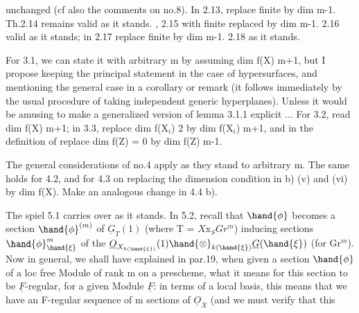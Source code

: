 
unchanged (cf also  the comments on no.8). In 2.13, replace finite
by dim \hand{$\leqslant$} m-1. Th.2.14 remains valid as it stands. , 2.15 with
finite replaced by dim \hand{$\leqslant$} m-1. 2.16 valid as it stands; in
 2.17 replace finite by dim \hand{$\leqslant$} m-1. 2.18 as it stands.

For 3.1, we can state it with arbitrary m by assuming
dim f(X) \hand{$\geqslant$} m+1, but I propose keeping the principal statement in
the case of hypersurfaces, and mentioning the general case in a corollary
or remark (it follows immediately by the usual procedure of
taking independent generic hyperplanes). Unless it would be
amusing to make a generalized version of lemma 3.1.1 explicit ...
For 3.2, read dim f(X)\hand{$\geqslant$} m+1; in 3.3, replace dim f(X$_i$) \hand{$\geqslant$} 2
by dim f(X$_i$)\hand{$\geqslant$} m+1, and in the definition of  replace dim f(Z) = 0
by dim f(Z) \hand{$\leqslant$} m-1.

The general considerations of no.4 apply as they stand
to arbitrary m. The same holds for 4.2, and for 4.3 on replacing
the dimension condition in b) (v) and (vi) by
dim f(X). Make an analogous change in 4.4 b).

The spiel 5.1 carries over as it stands. In 5.2, recall
that $\hand{\phi}$ becomes a section $\hand{\phi}^{(m)}$ of $\underline{G}_T(1)$ (where T 
 = $X\mathrm{x}_S Gr^m$)  inducing sections
$\hand{\phi}^m_{\hand{\xi}}$ of the   $\underline{O}_{X_{k(\hand{\xi})}}(1)\hand{\otimes}_{k(\hand{\xi})}\underline{G}(\hand{\xi})$ (for \hand{$\xi \in$} Gr$^m$). Now
in general, we shall have explained in par.19, when given a
 section $\hand{\phi}$ of a loc free Module of rank m on a prescheme, what
it means for this section to be $\underline{F}$-regular, for a given Module
$\underline{F}$: in terms of a local basis, this means that we have an
F-regular sequence of m sections of $\underline{O}_X$ (and we must verify that this

